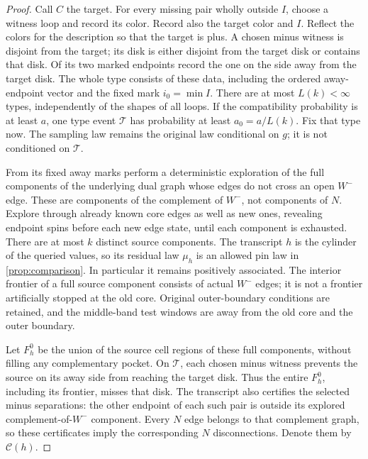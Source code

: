 \begin{proof}
Call $C$ the target. For every missing pair wholly outside $I$,
choose a witness loop and record its color. Record also the target
color and $I$. Reflect the colors for the description so that the
target is plus. A chosen minus witness is disjoint from the target;
its disk is either disjoint from the target disk or contains that
disk. Of its two marked endpoints record the one on the side away
from the target disk. The whole type consists of these data,
including the ordered away-endpoint vector and the fixed mark
$i_0=\min I$. There are at most $L(k)<\infty$ types, independently
of the shapes of all loops. If the compatibility probability is at
least $a$, one type event $\mathcal T$ has probability at least
$a_0=a/L(k)$. Fix that type now. The sampling law remains the
original law conditional on $g$; it is not conditioned on
$\mathcal T$.

From its fixed away marks perform a deterministic exploration of
the full components of the underlying dual graph whose edges do
not cross an open $W^-$ edge. These are components of the
complement of $W^-$, not components of $N$. Explore through already
known core edges as well as new ones, revealing endpoint spins
before each new edge state, until each component is exhausted.
There are at most $k$ distinct source components. The transcript
$h$ is the cylinder of the queried values, so its residual law
$\mu_h$ is an allowed pin law in \cref{prop:comparison}. In
particular it remains positively associated. The interior frontier
of a full source component consists of actual $W^-$ edges; it is
not a frontier artificially stopped at the old core. Original
outer-boundary conditions are retained, and the middle-band test
windows are away from the old core and the outer boundary.

Let $F_h^0$ be the union of the source cell regions of these
full components, without filling any complementary pocket. On
$\mathcal T$, each chosen minus witness prevents the source on its
away side from reaching the target disk. Thus the entire $F_h^0$,
including its frontier, misses that disk. The transcript also
certifies the selected minus separations: the other endpoint of
each such pair is outside its explored complement-of-$W^-$
component. Every $N$ edge belongs to that complement graph, so these
certificates imply the corresponding $N$ disconnections. Denote them by
$\mathcal C(h)$.


\end{proof}
